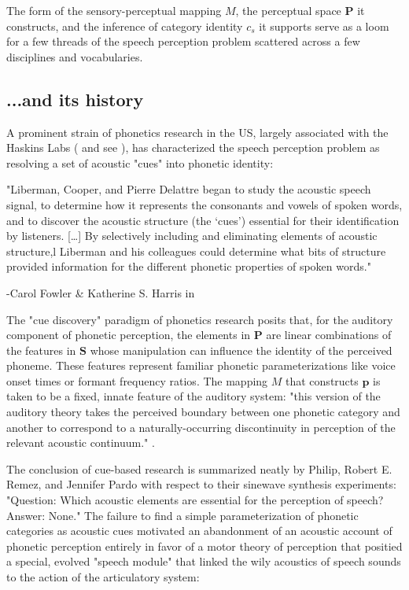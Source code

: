\begin{multicols}{2}
The form of the sensory-perceptual mapping $M$, the perceptual space $\mathbf{P}$ it constructs, and the inference of category identity $c_s$ it supports serve as a loom for a few threads of the speech perception problem scattered across a few disciplines and vocabularies.

\subsection{...and its history}

A prominent strain of phonetics research in the US, largely associated with the Haskins Labs (\cite{schertzPhoneticCueWeighting2020} and see \cite[p.~51]{ohalaGuideHistoryPhonetic1999}), has characterized the speech perception problem as resolving a set of acoustic "cues" into phonetic identity:

\begin{leftbar}
"Liberman, Cooper, and Pierre Delattre began to study the acoustic speech signal, to determine how it represents the consonants and vowels of spoken words, and to discover the acoustic structure (the `cues') essential for their identification by listeners. [\dots] By selectively including and eliminating elements of acoustic structure,l Liberman and his colleagues could determine what bits of structure provided information for the different phonetic properties of spoken words."

-Carol Fowler \& Katherine S. Harris in \cite[p.~51]{ohalaGuideHistoryPhonetic1999}
\end{leftbar}

The "cue discovery" paradigm of phonetics research posits that, for the auditory component of phonetic perception, the elements in $\mathbf{P}$ are linear combinations of the features in $\mathbf{S}$ whose manipulation can influence the identity of the perceived phoneme. These features represent familiar phonetic parameterizations like voice onset times or formant frequency ratios. The mapping $M$ that constructs $\mathbf{p}$ is taken to be a fixed, innate feature of the auditory system: "this version of the auditory theory takes the perceived boundary between one phonetic category and another to correspond to a naturally-occurring discontinuity in perception of the relevant acoustic continuum." \cite{Liberman1985a}. 

The conclusion of cue-based research is summarized neatly by Philip, Robert E. Remez, and Jennifer Pardo with respect to their sinewave synthesis experiments: "Question: Which acoustic elements are essential for the perception of speech? Answer: None\cite{HaskinsLaboratories2020}." The failure to find a simple parameterization of phonetic categories as acoustic cues motivated an abandonment of an acoustic account of phonetic perception entirely in favor of a motor theory of perception that positied a special, evolved "speech module" that linked the wily acoustics of speech sounds to the action of the articulatory system:


\end{multicols}
